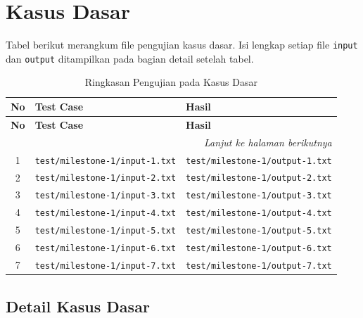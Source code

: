 ﻿\section{Kasus Dasar}
Tabel berikut merangkum file pengujian kasus dasar. Isi lengkap setiap file \texttt{input} dan \texttt{output} ditampilkan pada bagian detail setelah tabel.

\begin{longtable}{|c|>{\centering\arraybackslash}m{7cm}|>{\centering\arraybackslash}m{7cm}|}
    \caption{Ringkasan Pengujian pada Kasus Dasar} \label{tab:ringkasan_pengujian_dasar}         \\

    \hline
    \textbf{No} & \textbf{Test Case}                    & \textbf{Hasil}                         \\
    \hline
    \endfirsthead

    \hline
    \textbf{No} & \textbf{Test Case}                    & \textbf{Hasil}                         \\
    \hline
    \endhead

    \hline
    \multicolumn{3}{r}{\textit{Lanjut ke halaman berikutnya}}                                    \\
    \hline
    \endfoot

    \hline
    \endlastfoot

    1           & \texttt{test/milestone-1/input-1.txt} & \texttt{test/milestone-1/output-1.txt} \\
    \hline
    2           & \texttt{test/milestone-1/input-2.txt} & \texttt{test/milestone-1/output-2.txt} \\
    \hline
    3           & \texttt{test/milestone-1/input-3.txt} & \texttt{test/milestone-1/output-3.txt} \\
    \hline
    4           & \texttt{test/milestone-1/input-4.txt} & \texttt{test/milestone-1/output-4.txt} \\
    \hline
    5           & \texttt{test/milestone-1/input-5.txt} & \texttt{test/milestone-1/output-5.txt} \\
    \hline
    6           & \texttt{test/milestone-1/input-6.txt} & \texttt{test/milestone-1/output-6.txt} \\
    \hline
    7           & \texttt{test/milestone-1/input-7.txt} & \texttt{test/milestone-1/output-7.txt} \\
    \hline
\end{longtable}

\subsection*{Detail Kasus Dasar}

